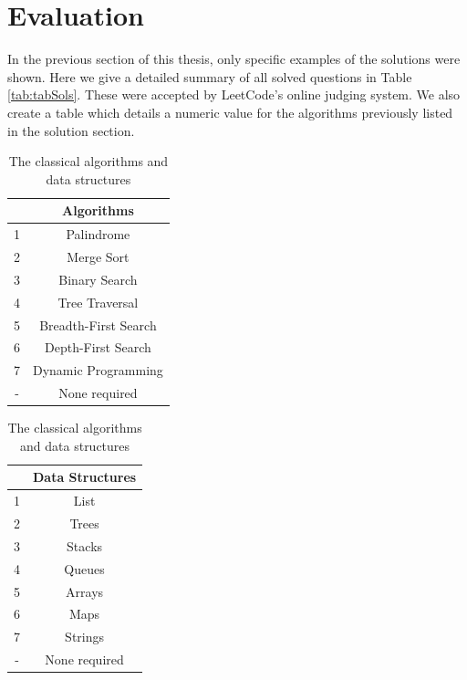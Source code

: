 \documentclass[10pt,twocolumn,hidelinks]{IEEEtran}
\begin{document}
\section{Evaluation}
In the previous section of this thesis, only specific examples of the solutions were shown. Here we give a detailed summary of all solved questions in Table \ref{tab:tabSols}. These were accepted by LeetCode's online judging system. 
We also create a table which details a numeric value for the algorithms previously listed in the solution section.
\begin{table}
\parbox{.45\linewidth}{
\centering
\begin{tabular}{|c|c|}
		    &Algorithms \\ \hline
		1 & Palindrome\\ \hline
		2 & Merge Sort\\ \hline
		3 & Binary Search\\ \hline
		4 & Tree Traversal \\ \hline
		5 & Breadth-First Search\\ \hline
		6 & Depth-First Search\\ \hline
		7 & Dynamic Programming\\ \hline
		- & None required\\ \hline
\end{tabular}
\caption{The classical algorithms and data structures}
\label{tab:classicalAlgos}
}
\hfill
\parbox{.45\linewidth}{
\centering
\begin{tabular}{|c|c|}
	&Data Structures \\ \hline
	1 & List\\ \hline
	2 & Trees\\ \hline
	3 & Stacks\\ \hline
	4 & Queues \\ \hline
	5 & Arrays\\ \hline
	6 & Maps\\ \hline	
	7&Strings\\ \hline
	-&None required\\
\end{tabular}
}
\end{table}
\end{document}
